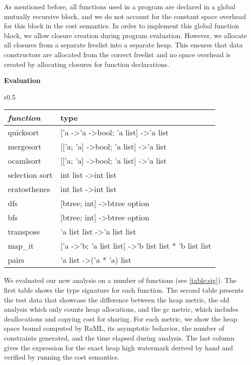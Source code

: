 \documentclass{easychair}
\theoremstyle{definition}
\begin{document}
As mentioned before, all functions used in a program are declared in a global mutually 
recursive block, and we do not account for the constant space overhead for this block in 
the cost semantics.  In order to implement this global function block, we allow closure creation
during program evaluation. However, we allocate all closures from a separate freelist into 
a separate heap.  This ensures that data constructors are allocated from the correct freelist 
and no space overhead is created by allocating closures for function declarations.

\textbf{Evaluation}
\label{sect:evaluation}
\begin{wraptable}{r}{0.5\textwidth}
	\vspace{-20pt}
		\begin{center}
	\begin{tabular}{l l}
		\hline
		\textit{\textbf{function}} & type \\ \hline
		quicksort & {[}'a -\textgreater 'a -\textgreater bool; 'a list{]} -\textgreater 'a list \\
		mergesort & {[}{[}'a; 'a{]} -\textgreater bool; 'a list{]} -\textgreater 'a list \\
		ocamlsort & {[}{[}'a; 'a{]} -\textgreater bool; 'a list{]} -\textgreater 'a list \\
		selection sort & int list -\textgreater int list \\
		eratosthenes & int list -\textgreater int list \\
		dfs & {[}btree; int{]} -\textgreater btree option \\
		bfs & {[}btree; int{]} -\textgreater btree option \\
		transpose & 'a list list -\textgreater 'a list list \\
		map\_it & {[}'a -\textgreater 'b; 'a list list{]} -\textgreater 'b list list * 'b list list \\
		pairs & 'a list -\textgreater ('a * 'a) list \\ \hline
	\end{tabular}
			\end{center}
				\vspace{-20pt}
			\caption{Signature of Test Functions}
		\vspace{-10pt}
\label{table:sig}
\end{wraptable}

We evaluated our new analysis on a number of functions (see \ref{table:sig}). 
The first table shows the type signature for each function. The second table presents the test 
data that
showcase the difference between the heap metric, the old analysis which only counts 
heap allocations, and the gc metric, which includes deallocations and copying cost for sharing.
For each metric, we show the heap space bound computed by RaML, its asymptotic behavior, 
the number of constraints generated, and the time elapsed during analysis. The last column gives
the expression for the exact heap high watermark derived by hand and verified by running the 
cost semantics.
\end{document}
